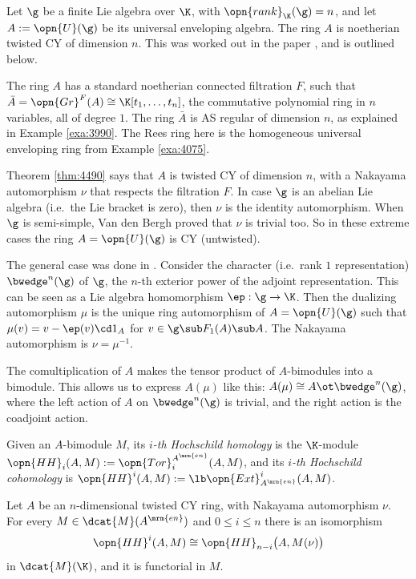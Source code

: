 \begin{exa} \label{exa:4505}
Let $\g$ be a finite Lie algebra over $\K$, with 
$\opn{rank}_{\K}(\g) = n$, and let 
$A := \opn{U}(\g)$ be its universal enveloping algebra. 
The ring $A$ is noetherian twisted CY of dimension $n$. This was worked out in 
the paper \cite{Ye4.5}, and is outlined below. 

The ring $A$ has a standard noetherian connected filtration $F$, such that 
$\bar{A} = \opn{Gr}^F(A) \cong \K[t_1, \ldots, t_n]$,
the commutative polynomial ring in $n$ variables, all of degree $1$. 
The ring $\bar{A}$ is AS regular of dimension $n$, as explained in
Example \ref{exa:3990}.
The Rees ring here is the homogeneous  universal enveloping ring from Example 
\ref{exa:4075}.

Theorem \ref{thm:4490} says that $A$ is twisted CY of dimension $n$, with a 
Nakayama automorphism $\nu$ that respects the filtration $F$. 
In case $\g$ is an abelian Lie algebra (i.e.\ the Lie bracket is zero), then  
$\nu$ is the identity automorphism. When $\g$ is semi-simple, 
Van den Bergh \cite{VdB2} proved that $\nu$ is trivial too. So in these extreme 
cases the ring $A = \opn{U}(\g)$ is CY (untwisted). 

The general case was done in \cite{Ye4.5}. Consider the character (i.e.\ 
rank $1$ representation) $\bwedge^n(\g)$ of $\g$, the $n$-th exterior power of 
the adjoint representation. This can be seen as a Lie algebra 
homomorphism $\ep : \g \to \K$. Then the dualizing automorphism $\mu$ is the 
unique ring automorphism of $A = \opn{U}(\g)$ such that 
$\mu(v) = v - \ep(v) \cd 1_A$
for $v \in \g \sub F_1(A) \sub A$.
The Nakayama automorphism is $\nu = \mu^{-1}$. 

The comultiplication of $A$ makes the tensor product of $A$-bimodules into a 
bimodule. This allows us to express $A(\mu)$ like this:
$A(\mu) \cong A \ot \bwedge^n(\g)$,
where the left action of $A$ on $\bwedge^n(\g)$ is trivial, and the right 
action is the coadjoint action.
\end{exa}

Given an $A$-bimodule $M$, its {\em $i$-th Hochschild homology} is the 
$\K$-module \lb 
$\opn{HH}_i(A, M) := \opn{Tor}_i^{A^{\mrm{en}}}(A, M)$,  
and its {\em $i$-th Hochschild cohomology} is 
$\opn{HH}^i(A, M) := \lb \opn{Ext}^i_{A^{\mrm{en}}}(A, M)$. 

\begin{thm} \label{thm:4860}
Let $A$ be an $n$-dimensional twisted CY ring, with Nakayama automorphism 
$\nu$. For every $M \in \dcat{M}(A^{\mrm{en}})$ and 
$0 \leq i \leq n$ there is an isomorphism 
\[ \opn{HH}^i(A, M) \cong \opn{HH}_{n - i} \bigl( A, M(\nu) \bigr) \] 
in $\dcat{M}(\K)$, and it is functorial in $M$. 
\end{thm}

